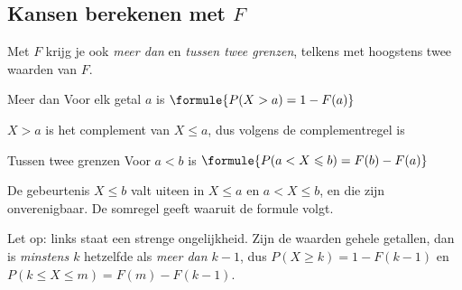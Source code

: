 \subsection{Kansen berekenen met $F$}

Met $F$ krijg je ook \textit{meer dan} en \textit{tussen twee grenzen}, telkens met hoogstens twee waarden van $F$.

\begin{theorie}
\begin{stelling}{Meer dan}
Voor elk getal $a$ is \quad $\formule{P(X > a) = 1 - F(a)}$
\end{stelling}

\begin{bewijs}
\textit{$X > a$} is het complement van \textit{$X \leqslant a$}, dus volgens de complementregel is
\end{bewijs}

\begin{stelling}{Tussen twee grenzen}
Voor $a < b$ is \quad $\formule{P(a < X \leqslant b) = F(b) - F(a)}$
\end{stelling}

\begin{bewijs}
De gebeurtenis \textit{$X \leqslant b$} valt uiteen in \textit{$X \leqslant a$} en \textit{$a < X \leqslant b$}, en die zijn onverenigbaar. De somregel geeft
waaruit de formule volgt.
\end{bewijs}
\end{theorie}

Let op: links staat een strenge ongelijkheid. Zijn de waarden gehele getallen, dan is \textit{minstens $k$} hetzelfde als \textit{meer dan $k - 1$}, dus $P(X \geqslant k) = 1 - F(k - 1)$ en $P(k \leqslant X \leqslant m) = F(m) - F(k - 1)$.


